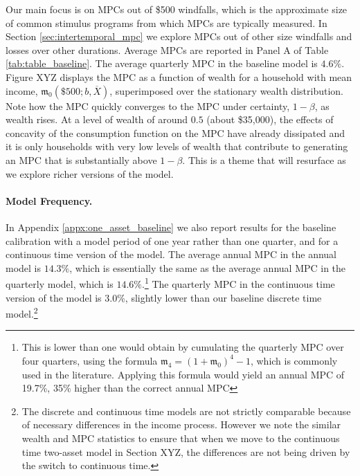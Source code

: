 Our main focus is on MPCs out of \$500 windfalls, which is the approximate size of common stimulus programs from which MPCs are typically measured. In Section \ref{sec:intertemporal_mpc} we explore MPCs out of other size windfalls and losses over other durations. Average MPCs are reported in Panel A of Table \ref{tab:table_baseline}. The average quarterly MPC in the baseline model is $4.6\%$. Figure XYZ displays the MPC as a function of wealth for a household with mean income, $\mathfrak{m}_{0}\left(\$500;b,\overline{X}\right)$, superimposed over the stationary wealth distribution. Note how the MPC quickly converges to the MPC under certainty, $1-\beta$, as wealth rises. At a level of wealth of around $0.5$ (about \$35,000), the effects of concavity of the consumption function on the MPC have already dissipated and it is only households with very low levels of wealth that contribute to generating an MPC that is substantially above $1-\beta$. This is a theme that will resurface as we explore richer versions of the model.


\paragraph{Model Frequency.}
In Appendix \ref{appx:one_asset_baseline} we also report results for the baseline calibration with a model period of one year rather than one quarter, and for a continuous time version of the model. The average annual MPC in the annual model is $14.3\%$, which is essentially the same as the average annual MPC in the quarterly model, which is $14.6\%$.\footnote{This is lower than one would obtain by cumulating the quarterly MPC over four quarters, using the formula $\mathfrak{m}_{4} = \left(1+\mathfrak{m}_{0}\right)^{4} -1$, which is commonly used in the literature. Applying this formula would yield an annual MPC of 19.7\%, 35\% higher than the correct annual MPC}
The quarterly MPC in the continuous time version of the model is 3.0\%, slightly lower than our baseline discrete time model.\footnote{The discrete and continuous time models are not strictly comparable because of necessary differences in the income process. However we note the similar wealth and MPC statistics to ensure that when we move to the continuous time two-asset model in Section XYZ, the differences are not being driven by the switch to continuous time.} 


